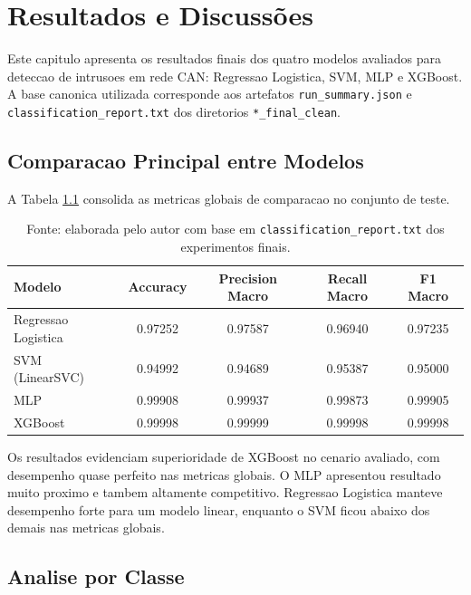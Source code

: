 \chapter{Resultados e Discussões}

Este capitulo apresenta os resultados finais dos quatro modelos avaliados para deteccao de intrusoes em rede CAN: Regressao Logistica, SVM, MLP e XGBoost. A base canonica utilizada corresponde aos artefatos \texttt{run\_summary.json} e \texttt{classification\_report.txt} dos diretorios \texttt{*\_final\_clean}.

\section{Comparacao Principal entre Modelos}

A Tabela \ref{tab:comparacao_principal} consolida as metricas globais de comparacao no conjunto de teste.

\begin{table}[H]
\centering
\caption{Comparacao principal entre os modelos (resultados finais limpos)}
\begin{tabular}{|l|c|c|c|c|}
\hline
\textbf{Modelo} & \textbf{Accuracy} & \textbf{Precision Macro} & \textbf{Recall Macro} & \textbf{F1 Macro} \\
\hline
Regressao Logistica & 0.97252 & 0.97587 & 0.96940 & 0.97235 \\
SVM (LinearSVC) & 0.94992 & 0.94689 & 0.95387 & 0.95000 \\
MLP & 0.99908 & 0.99937 & 0.99873 & 0.99905 \\
XGBoost & 0.99998 & 0.99999 & 0.99998 & 0.99998 \\
\hline
\end{tabular}
\label{tab:comparacao_principal}
\caption*{Fonte: elaborada pelo autor com base em \texttt{classification\_report.txt} dos experimentos finais.}
\end{table}

Os resultados evidenciam superioridade de XGBoost no cenario avaliado, com desempenho quase perfeito nas metricas globais. O MLP apresentou resultado muito proximo e tambem altamente competitivo. Regressao Logistica manteve desempenho forte para um modelo linear, enquanto o SVM ficou abaixo dos demais nas metricas globais.

\section{Analise por Classe}

